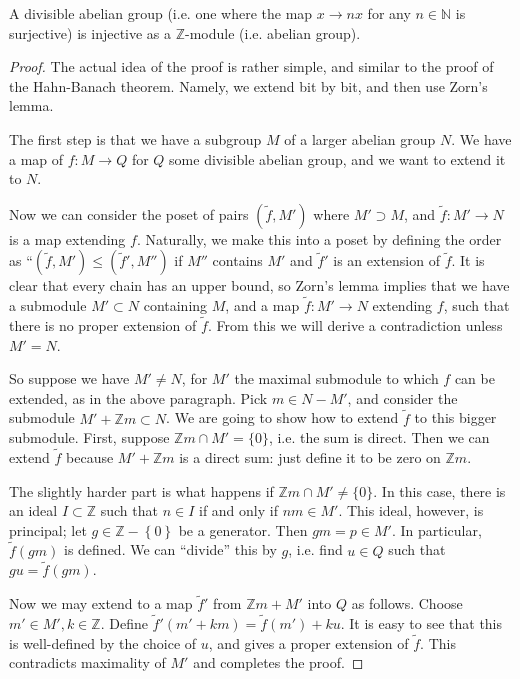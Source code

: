 \begin{theorem}\label{divisibleimpliesinj}
A divisible abelian group (i.e. one where the map $x
\to nx$ for any $n \in \mathbb{N}$ is surjective) is injective as  a
$\mathbb{Z}$-module (i.e. abelian group).
\end{theorem}

\begin{proof}
The actual idea of the proof is rather simple, and similar to the proof
of the Hahn-Banach theorem.
Namely, we extend bit by bit, and then use Zorn's lemma.

The first step is that we have a subgroup $M $ of a larger abelian
group $N$.
We have a map of $f:M \to Q$ for $Q$ some divisible abelian group, and we
want to extend it to $N$.

Now we can consider the poset of pairs $(\tilde{f}, M')$ where $M' \supset
  M$, and $\tilde{f}: M' \to N$ is a map extending $f$.
  Naturally, we make this into a poset by defining the order as ``$(\tilde{f},
  M') \leq (\tilde{f}', M'')$ if $M'' $ contains $M'$ and $\tilde{f}'$
 is an extension of $\tilde{f}$.
  It is clear that every chain has an upper bound, so Zorn's lemma implies
  that we have a submodule $M' \subset N$ containing $M$, and a map $\tilde{f}: M'
  \to N$ extending $f$, such that there is no proper extension of $\tilde{f}$.
  From this we will derive a contradiction unless $M' = N$.

So suppose we have $M' \neq N$, for $M'$ the maximal submodule to which $f$
can be extended, as in the above paragraph.  Pick $m \in N - M'$, and consider the
submodule $M' + \mathbb{Z} m \subset N$.  We are going to show how to extend $\tilde{f}$
to this bigger submodule.  First, suppose $\mathbb{Z}m \cap M' = \{0\}$,
i.e. the sum is direct.  Then we can extend $\tilde{f}$ because $M' +
\mathbb{Z}m$ is a
direct sum: just define it to be zero on $\mathbb{Z}m$.

The slightly harder part is what happens if $\mathbb{Z} m \cap M' \neq \{ 0\}$.
In this case, there is an ideal $I \subset \mathbb{Z}$ such that $n \in I$
if and only if $nm \in M'$.
This ideal, however, is principal; let $g \in \mathbb{Z} - \left\{0\right\}$ be a generator.  Then $gm = p
\in M'$.  In particular, $\tilde{f}(gm)$ is defined.
We can ``divide'' this
by $g$, i.e. find $u \in Q$ such that $gu = \tilde{f}(gm)$. 

Now we may extend to a
map $\tilde{f}'$ from $\mathbb{Z} m + M'$ into $Q$ as follows.  Choose $m'
\in M', k \in \mathbb{Z}$.  Define $\tilde{f}'( m' + km) = \tilde{f}(m')
+ k u$.  It is easy to see that this is well-defined by the choice of $u$,
and gives a proper extension of $\tilde{f}$. This contradicts maximality of
$M'$ and completes the proof.
\end{proof}

